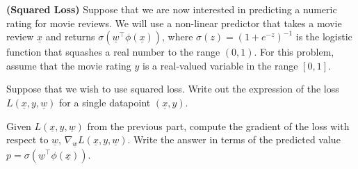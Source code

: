 \documentclass{article}
\renewcommand{\vec}[1]{\underline{#1}}
\newcommand{\vecw}{\vec{w}}
\theoremstyle{definition}
\newtheorem*{answer}{Answer}
\begin{document}
\begin{question}
	\item \textbf{(Squared Loss)} Suppose that we are now interested in predicting a numeric rating for movie reviews. We will use a non-linear predictor that takes a movie review $\underline{x}$ and returns $\sigma(\underline{w}^\top\phi(\underline{x}))$, where $\sigma(z)=(1+e^{-z})^{-1}$ is the logistic function that squashes a real number to the range $(0,1)$. For this problem, assume that the movie rating $y$ is a real-valued variable in the range $[0,1]$.
	\begin{question}
		\item Suppose that we wish to use squared loss. Write out the expression of the loss $L(\underline{x},y,\underline{w})$ for a single datapoint $(\underline{x},y)$.
		\item Given $L(\underline{x},y,\underline{w})$ from the previous part, compute the gradient of the loss with respect to $\underline{w}$, $\nabla_{\underline{w}}L(\underline{x},y,\underline{w})$. Write the answer in terms of the predicted value $p=\sigma(\underline{w}^\top\phi(\underline{x}))$.

\end{question}
\end{question}
\end{document}
